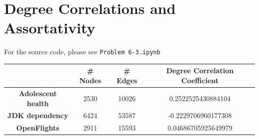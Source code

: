\section{Degree Correlations and Assortativity}
For the source code, please see \texttt{Problem 6-3.ipynb}\\

\begin{tabular}{c  c c c}
  & \textbf{\#  Nodes}&  \textbf{\# Edges}&\textbf{ Degree Correlation Coefficient}\\
\hline
 \textbf{ Adolescent health}& 2530& 10026&0.2522525430884104 \\
  \textbf{JDK dependency}&6424 &53587 &  -0.2229706960177308\\
  \textbf{OpenFlights}&2911 &15593 & 0.04686705925649979\\
\end{tabular}

